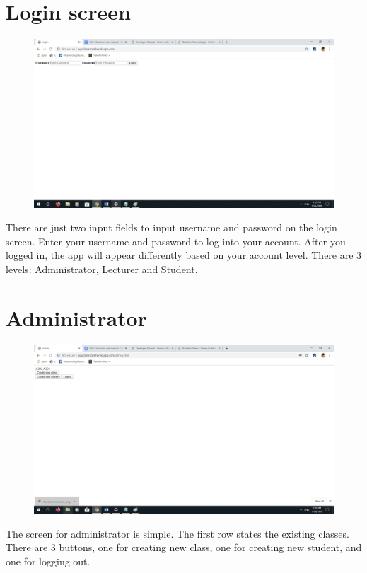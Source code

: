 \documentclass[a4paper, 11pt,openany]{book} %
\begin{document}
\section{Login screen}
\begin{figure}[H]
    \centering
    \includegraphics[width=\textwidth,height=\textheight,keepaspectratio]{images/1.png}
\end{figure}
There are just two input fields to input username and password on the login screen. Enter your username and password to log into your account. After you logged in, the app will appear differently based on your account level. There are 3 levels: Administrator, Lecturer and Student.
\section{Administrator}
\begin{figure}[H]
    \centering
    \includegraphics[width=\textwidth,height=\textheight,keepaspectratio]{images/2.png}
\end{figure}
The screen for administrator is simple. The first row states the existing classes. There are  3 buttons, one for creating new class, one for creating new student, and one for logging out.
\end{document}
